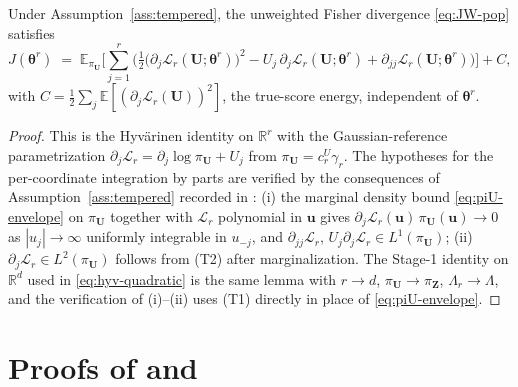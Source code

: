 \documentclass[review,hidelinks,onefignum,onetabnum]{siamart251216}
\newcommand{\RR}{\mathbb{R}}
\newcommand{\EE}{\mathbb{E}}
\newcommand{\gauss}{\gamma}
\newcommand{\vbeta}{\bm{\theta}^{r}}
\newcommand{\vZ}{\bm{Z}}
\newcommand{\vu}{\bm{u}}
\newcommand{\vU}{\bm{U}}
\newcommand{\scL}{\mathcal{L}}
\begin{document}
\begin{lemma}
\label{lem:hyv-sm}
Under Assumption~\ref{ass:tempered}, the unweighted Fisher divergence \eqref{eq:JW-pop} satisfies
\begin{equation}
  J(\vbeta)
  \;=\;\EE_{\pi_{\vU}}\!\Big[\sum_{j=1}^r\Big(\tfrac12\bigl(\partial_j\scL_r(\vU;\vbeta)\bigr)^2-U_j\,\partial_j\scL_r(\vU;\vbeta)+\partial_{jj}\scL_r(\vU;\vbeta)\Big)\Big]+C,
  \label{eq:sm-hyv}
\end{equation}
with $C=\tfrac12\sum_j\EE[(\partial_j\scL_r(\vU))^2]$, the true-score energy, independent of $\vbeta$.
\end{lemma}

\begin{proof}
This is the Hyvärinen identity \cite[Thm.~1]{Hyvarinen2005} on $\RR^r$ with the Gaussian-reference parametrization $\partial_j\scL_r = \partial_j\log\pi_{\vU} + U_j$ from $\pi_{\vU} = c_r^{U}\gauss_r$. The hypotheses for the per-coordinate integration by parts are verified by the consequences of Assumption~\ref{ass:tempered} recorded in : (i) the marginal density bound \eqref{eq:piU-envelope} on $\pi_{\vU}$ together with $\scL_r$ polynomial in $\vu$ gives $\partial_j\scL_r(\vu)\,\pi_{\vU}(\vu) \to 0$ as $|u_j|\to\infty$ uniformly integrable in $u_{-j}$, and $\partial_{jj}\scL_r,\, U_j\partial_j\scL_r \in L^1(\pi_{\vU})$; (ii) $\partial_j\scL_r \in L^2(\pi_{\vU})$ follows from (T2) after marginalization. The Stage-1 identity on $\RR^d$ used in \eqref{eq:hyv-quadratic} is the same lemma with $r \to d$, $\pi_{\vU} \to \pi_{\vZ}$, $\Lambda_r \to \Lambda$, and the verification of (i)--(ii) uses (T1) directly in place of \eqref{eq:piU-envelope}.
\end{proof}

\section{Proofs of  and }
\label{app:thm-trunc}
\end{document}
